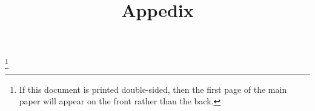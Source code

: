 










\newpage
\thispagestyle{empty}
\begin{center}
  \vspace*{\fill}
          \footnote{If this document is printed double-sided,
          then the first page of the main paper will appear on the
          front rather than the back.}
  \vspace*{\fill}
\end{center}
\newpage


\acresetall















\acresetall




\newpage
\appendix
\title{Appedix}
\date{}
\author{}
\subtitle{}
\titlenote{}
\maketitle
\acresetall





\newpage



\raggedright
\newpage


\newpage




